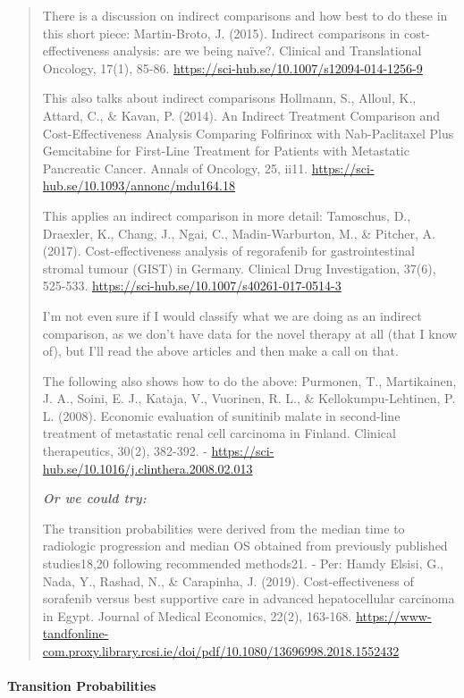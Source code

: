 \documentclass[
]{article}
\begin{document}
\begin{quote}
There is a discussion on indirect comparisons and how best to do these
in this short piece: Martin-Broto, J. (2015). Indirect comparisons in
cost-effectiveness analysis: are we being naïve?. Clinical and
Translational Oncology, 17(1), 85-86.
\url{https://sci-hub.se/10.1007/s12094-014-1256-9}

This also talks about indirect comparisons Hollmann, S., Alloul, K.,
Attard, C., \& Kavan, P. (2014). An Indirect Treatment Comparison and
Cost-Effectiveness Analysis Comparing Folfirinox with Nab-Paclitaxel
Plus Gemcitabine for First-Line Treatment for Patients with Metastatic
Pancreatic Cancer. Annals of Oncology, 25, ii11.
\url{https://sci-hub.se/10.1093/annonc/mdu164.18}

This applies an indirect comparison in more detail: Tamoschus, D.,
Draexler, K., Chang, J., Ngai, C., Madin-Warburton, M., \& Pitcher, A.
(2017). Cost-effectiveness analysis of regorafenib for gastrointestinal
stromal tumour (GIST) in Germany. Clinical Drug Investigation, 37(6),
525-533. \url{https://sci-hub.se/10.1007/s40261-017-0514-3}

I'm not even sure if I would classify what we are doing as an indirect
comparison, as we don't have data for the novel therapy at all (that I
know of), but I'll read the above articles and then make a call on that.

The following also shows how to do the above: Purmonen, T., Martikainen,
J. A., Soini, E. J., Kataja, V., Vuorinen, R. L., \&
Kellokumpu-Lehtinen, P. L. (2008). Economic evaluation of sunitinib
malate in second-line treatment of metastatic renal cell carcinoma in
Finland. Clinical therapeutics, 30(2), 382-392. -
\url{https://sci-hub.se/10.1016/j.clinthera.2008.02.013}

\textbf{\emph{Or we could try:}}

The transition probabilities were derived from the median time to
radiologic progression and median OS obtained from previously published
studies18,20 following recommended methods21. - Per: Hamdy Elsisi, G.,
Nada, Y., Rashad, N., \& Carapinha, J. (2019). Cost-effectiveness of
sorafenib versus best supportive care in advanced hepatocellular
carcinoma in Egypt. Journal of Medical Economics, 22(2), 163-168.
\url{https://www-tandfonline-com.proxy.library.rcsi.ie/doi/pdf/10.1080/13696998.2018.1552432}
\end{quote}

\hypertarget{transition-probabilities}{%
\paragraph{Transition Probabilities}\label{transition-probabilities}}
\end{document}
